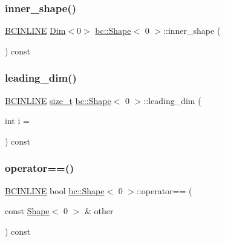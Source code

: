 \mbox{\label{structbc_1_1Shape_3_010_01_4_a26d9ca2d95672e1b61b54b160b0eaef4}} 
\subsubsection{\texorpdfstring{inner\+\_\+shape()}{inner\_shape()}}
{\footnotesize\ttfamily \hyperlink{common_8h_a6699e8b0449da5c0fafb878e59c1d4b1}{B\+C\+I\+N\+L\+I\+NE} \hyperlink{structbc_1_1Dim}{Dim}$<$0$>$ \hyperlink{structbc_1_1Shape}{bc\+::\+Shape}$<$ 0 $>$\+::inner\+\_\+shape (\begin{DoxyParamCaption}{ }\end{DoxyParamCaption}) const\hspace{0.3cm}{\ttfamily [inline]}}

\mbox{\label{structbc_1_1Shape_3_010_01_4_a5ab2afc6a77a328d1accdd436ed4ed5d}} 
\subsubsection{\texorpdfstring{leading\+\_\+dim()}{leading\_dim()}}
{\footnotesize\ttfamily \hyperlink{common_8h_a6699e8b0449da5c0fafb878e59c1d4b1}{B\+C\+I\+N\+L\+I\+NE} \hyperlink{structbc_1_1Shape_3_010_01_4_a7bf4db55cfc575f40871044048ea5c03}{size\+\_\+t} \hyperlink{structbc_1_1Shape}{bc\+::\+Shape}$<$ 0 $>$\+::leading\+\_\+dim (\begin{DoxyParamCaption}\item[{int}]{i = {} }\end{DoxyParamCaption}) const\hspace{0.3cm}{\ttfamily [inline]}}

\mbox{\label{structbc_1_1Shape_3_010_01_4_adeda1d4a7ac105d365276716998e65de}} 
\subsubsection{\texorpdfstring{operator==()}{operator==()}}
{\footnotesize\ttfamily \hyperlink{common_8h_a6699e8b0449da5c0fafb878e59c1d4b1}{B\+C\+I\+N\+L\+I\+NE} bool \hyperlink{structbc_1_1Shape}{bc\+::\+Shape}$<$ 0 $>$\+::operator== (\begin{DoxyParamCaption}\item[{const \hyperlink{structbc_1_1Shape}{Shape}$<$ 0 $>$ \&}]{other }\end{DoxyParamCaption}) const\hspace{0.3cm}{\ttfamily [inline]}}

